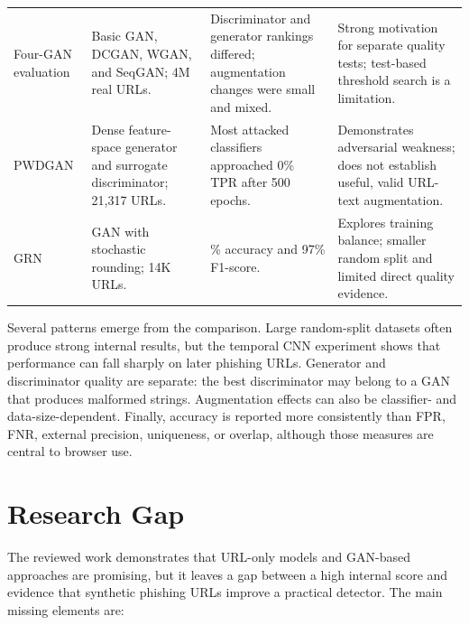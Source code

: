 \begin{longtable}{@{}>{\raggedright\arraybackslash}p{}>{\raggedright\arraybackslash}p{}>{\raggedright\arraybackslash}p{}>{\raggedright\arraybackslash}p{}@{}}
Four-GAN evaluation \citep{pham2023evaluation} & Basic GAN, DCGAN, WGAN, and SeqGAN; 4M real URLs. & Discriminator and generator rankings differed; augmentation changes were small and mixed. & Strong motivation for separate quality tests; test-based threshold search is a limitation. \\

PWDGAN \citep{bac2021pwdgan} & Dense feature-space generator and surrogate discriminator; 21,317 URLs. & Most attacked classifiers approached 0\% TPR after 500 epochs. & Demonstrates adversarial weakness; does not establish useful, valid URL-text augmentation. \\

GRN \citep{wanda2025deep} & GAN with stochastic rounding; 14K URLs. & 95\% accuracy and 97\% F1-score. & Explores training balance; smaller random split and limited direct quality evidence. \\
\end{longtable}
\normalsize

Several patterns emerge from the comparison. Large random-split datasets often
produce strong internal results, but the temporal CNN experiment shows that
performance can fall sharply on later phishing URLs. Generator and
discriminator quality are separate: the best discriminator may belong to a GAN
that produces malformed strings. Augmentation effects can also be classifier-
and data-size-dependent. Finally, accuracy is reported more consistently than
FPR, FNR, external precision, uniqueness, or overlap, although those measures
are central to browser use.

\section{Research Gap}

The reviewed work demonstrates that URL-only models and GAN-based approaches
are promising, but it leaves a gap between a high internal score and evidence
that synthetic phishing URLs improve a practical detector. The main missing
elements are:

